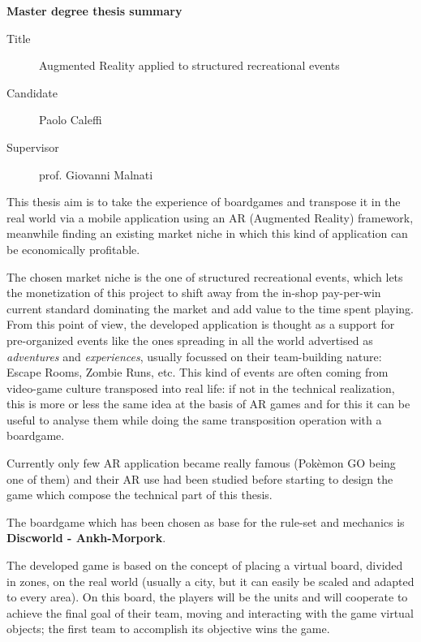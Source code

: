 \documentclass[
	twoside]				%
	{toptesi}				%
\begin{document}
	\english
	
	\mainmatter
	
	\textbf{\LARGE{Master degree thesis summary}}
	
	\begin{description}
		\item[Title] Augmented Reality applied to structured recreational events
		\item[Candidate] Paolo Caleffi
		\item[Supervisor] prof. Giovanni Malnati
	\end{description}
	
	This thesis aim is to take the experience of boardgames and transpose it in the real world via a mobile application using an AR (Augmented Reality) framework, meanwhile finding an existing market niche in which this kind of application can be economically profitable.
	
	The chosen market niche is the one of structured recreational events, which lets the monetization of this project to shift away from the in-shop pay-per-win current standard dominating the market and add value to the time spent playing.  
	From this point of view, the developed application is thought as a support for pre-organized events like the ones spreading in all the world advertised as \emph{adventures} and \emph{experiences}, usually focussed on their team-building nature: Escape Rooms, Zombie Runs, etc.
	This kind of events are often coming from video-game culture transposed into real life: if not in the technical realization, this is more or less the same idea at the basis of AR games and for this it can be useful to analyse them while doing the same transposition operation with a boardgame.
	
	Currently only few AR application became really famous (Pokèmon GO being one of them) and their AR use had been studied before starting to design the game which compose the technical part of this thesis.
	
	The boardgame which has been chosen as base for the rule-set and mechanics is \textbf{Discworld - Ankh-Morpork}.
	
	The developed game is based on the concept of placing a virtual board, divided in zones, on the real world (usually a city, but it can easily be scaled and adapted to every area). On this board, the players will be the units and will cooperate to achieve the final goal of their team, moving and interacting with the game virtual objects; the first team to accomplish its objective wins the game.
	
\end{document}
